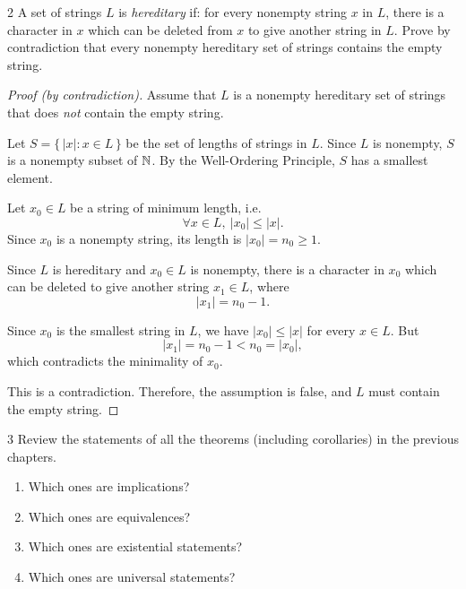 \begin{exercise}{2}
    A set of strings $L$ is \emph{hereditary} if: for every nonempty string $x$
    in $L$, there is a character in $x$ which can be deleted from $x$ to give
    another string in $L$. Prove by contradiction that every nonempty hereditary
    set of strings contains the empty string.
\end{exercise}
\begin{solbox}
\begin{proof}[Proof (by contradiction)]
    Assume that $L$ is a nonempty hereditary set of strings that does
    \emph{not} contain the empty string.

    Let $S = \{\,|x| : x \in L\,\}$ be the set of lengths of strings
    in $L$. Since $L$ is nonempty, $S$ is a nonempty subset of $\mathbb{N}$.
    By the Well-Ordering Principle, $S$ has a smallest element.

    Let $x_0 \in L$ be a string of minimum length, i.e.
    \[
        \forall x \in L,\ |x_0| \le |x|.
    \]
    Since $x_0$ is a nonempty string, its length is
    $|x_0| = n_0 \ge 1$.

    Since $L$ is hereditary and $x_0 \in L$ is nonempty, there is a
    character in $x_0$ which can be deleted to give another string
    $x_1 \in L$, where
    \[
        |x_1| = n_0 - 1.
    \]

    Since $x_0$ is the smallest string in $L$, we have
    $|x_0| \le |x|$ for every $x \in L$. But
    \[
        |x_1| = n_0 - 1 < n_0 = |x_0|,
    \]
    which contradicts the minimality of $x_0$.

    This is a contradiction. Therefore, the assumption is false, and
    $L$ must contain the empty string.
\end{proof}
\end{solbox}

\begin{exercise}{3}
    Review the statements of all the theorems (including corollaries) in the
    previous chapters.
    \begin{enumerate}[label=(\alph*)]
        \item Which ones are implications?
        \item Which ones are equivalences?
        \item Which ones are existential statements?
        \item Which ones are universal statements?
    \end{enumerate}
\end{exercise}

